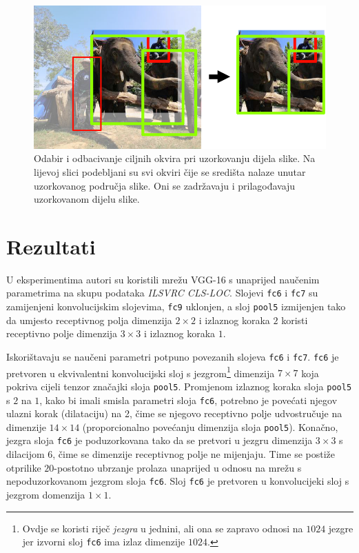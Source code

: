 \documentclass[utf8, seminar, numeric, lmodern]{feri}
\begin{document}
\begin{figure}[htbp] \centering
	\includegraphics[max width=1\linewidth]{ilustracije/prosirivanje-podataka}
	\caption{Odabir i odbacivanje ciljnih okvira pri uzorkovanju dijela slike. Na lijevoj slici podebljani su svi okviri čije se središta nalaze unutar uzorkovanog područja slike. Oni se zadržavaju i prilagođavaju uzorkovanom dijelu slike.}
	\label{fig:prosirivanje-podataka}
\end{figure}




\chapter{Rezultati} \label{chap:rezultati}

U eksperimentima autori su koristili mrežu VGG-16 s unaprijed naučenim parametrima na skupu podataka \emph{ILSVRC CLS-LOC}. Slojevi \texttt{fc6} i \texttt{fc7} su zamijenjeni konvolucijskim slojevima, \texttt{fc9} uklonjen, a sloj \texttt{pool5} izmijenjen tako da umjesto receptivnog polja dimenzija $2\times2$ i izlaznog koraka $2$ koristi receptivno polje dimenzija $3\times 3$ i izlaznog koraka $1$. 

Iskorištavaju se naučeni parametri potpuno povezanih slojeva \texttt{fc6} i \texttt{fc7}. \texttt{fc6} je pretvoren u ekvivalentni konvolucijski sloj s jezgrom\footnote{Ovdje se koristi riječ \emph{jezgra} u jednini, ali ona se zapravo odnosi na $1024$ jezgre jer izvorni sloj \texttt{fc6} ima izlaz dimenzije $1024$.} dimenzija $7\times 7$ koja pokriva cijeli tenzor značajki sloja \texttt{pool5}. Promjenom izlaznog koraka sloja \texttt{pool5} s $2$ na $1$, kako bi imali smisla parametri sloja \texttt{fc6}, potrebno je povećati njegov ulazni korak (dilataciju) na 2, čime se njegovo receptivno polje udvostručuje na dimenzije $14\times 14$ (proporcionalno povećanju dimenzija sloja \texttt{pool5}). Konačno, jezgra sloja \texttt{fc6} je poduzorkovana tako da se pretvori u jezgru dimenzija $3\times 3$ s dilacijom 6, čime se dimenzije receptivnog polje ne mijenjaju. Time se postiže otprilike $20$-postotno ubrzanje prolaza unaprijed u odnosu na mrežu s nepoduzorkovanom jezgrom sloja \texttt{fc6}. Sloj \texttt{fc6} je pretvoren u konvolucijeki sloj s jezgrom domenzija $1\times 1$.
\end{document}
